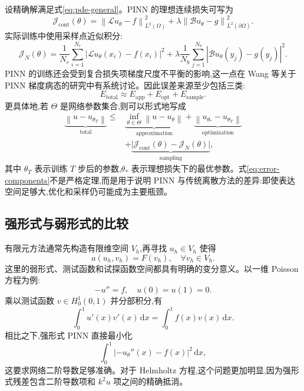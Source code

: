 \documentclass[12pt,hyperref,a4paper,UTF8,twoside]{ctexart}
\newcommand{\dd}{\mathrm d}
\newcommand{\calL}{\mathcal L}
\newcommand{\calJ}{\mathcal J}
\newcommand{\norm}[1]{\left\lVert #1\right\rVert}
\begin{document}
设精确解满足式\eqref{eq:pde-general}。PINN 的理想连续损失可写为
\begin{equation}\label{eq:continuous-pinn-loss}
    \calJ_{\mathrm{cont}}(\theta)
    =\norm{\calL u_\theta-f}_{L^2(\Omega)}^2
    +\lambda\norm{\mathcal B u_\theta-g}_{L^2(\partial\Omega)}^2.
\end{equation}
实际训练中使用采样点近似积分:
\begin{equation}\label{eq:quadrature-loss}
    \calJ_{N}(\theta)
    =\frac1{N_r}\sum_{i=1}^{N_r}|\calL u_\theta(x_i)-f(x_i)|^2
    +\lambda\frac1{N_b}\sum_{j=1}^{N_b}|\mathcal B u_\theta(y_j)-g(y_j)|^2.
\end{equation}
PINN 的训练还会受到复合损失项梯度尺度不平衡的影响,这一点在 Wang 等关于 PINN 梯度病态的研究中有系统讨论\cite{wang2021understanding}。因此误差来源至少包括三类:
\begin{equation}\label{eq:error-decomp-informal}
    E_{\mathrm{total}}
    \approx
    E_{\mathrm{app}}+E_{\mathrm{opt}}+E_{\mathrm{sample}}.
\end{equation}
更具体地,若 $\Theta$ 是网络参数集合,则可以形式地写成
\begin{equation}\label{eq:error-components}
\begin{aligned}
    \underbrace{\norm{u-u_{\theta_T}}}_{\text{total}}
    \leq{}&
    \underbrace{\inf_{\theta\in\Theta}\norm{u-u_\theta}}_{\text{approximation}}
    +\underbrace{\norm{u_{\theta_*}-u_{\theta_T}}}_{\text{optimization}}\\
    &+\underbrace{\bigl|\calJ_{\mathrm{cont}}(\theta)-\calJ_N(\theta)\bigr|}_{\text{sampling}},
\end{aligned}
\end{equation}
其中 $\theta_T$ 表示训练 $T$ 步后的参数,$\theta_*$ 表示理想损失下的最优参数。式\eqref{eq:error-components}不是严格定理,而是用于说明 PINN 与传统离散方法的差异:即使表达空间足够大,优化和采样仍可能成为主要瓶颈。

\subsection{强形式与弱形式的比较}

有限元方法通常先构造有限维空间 $V_h$,再寻找 $u_h\in V_h$ 使得
\begin{equation}\label{eq:fem-weak}
    a(u_h,v_h)=F(v_h),\quad \forall v_h\in V_h.
\end{equation}
这里的弱形式、测试函数和试探函数空间都具有明确的变分意义。以一维 Poisson 方程为例:
\begin{equation}\label{eq:poisson-model}
    -u''=f,\quad u(0)=u(1)=0.
\end{equation}
乘以测试函数 $v\in H_0^1(0,1)$ 并分部积分,有
\begin{equation}\label{eq:poisson-weak}
    \int_0^1 u'(x)v'(x)\,\dd x=\int_0^1 f(x)v(x)\,\dd x.
\end{equation}
相比之下,强形式 PINN 直接最小化
\begin{equation}\label{eq:poisson-strong-loss}
    \int_0^1|-u_\theta''(x)-f(x)|^2\,\dd x,
\end{equation}
这要求网络二阶导数足够准确。对于 Helmholtz 方程,这个问题更加明显,因为强形式残差包含二阶导数项和 $k^2u$ 项之间的精确抵消。
\end{document}
